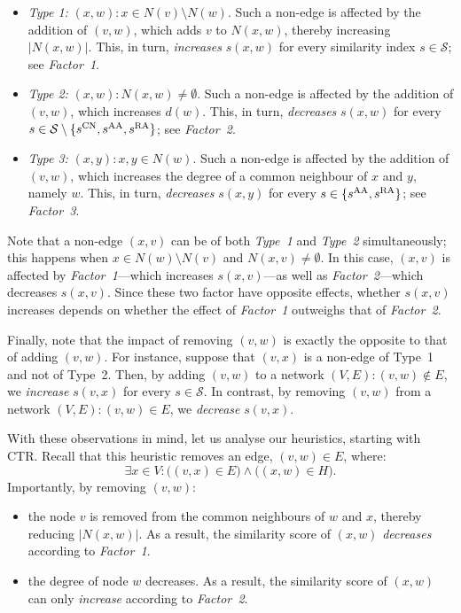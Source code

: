 \documentclass[twocolumn]{article}
\newcommand{\Hide}{H}
\newcommand{\sCN}{s^{\text{\normalfont CN}}}
\newcommand{\sAA}{s^{\text{\normalfont AA}}}
\newcommand{\sRA}{s^{\text{\normalfont RA}}}
\begin{document}
\begin{itemize}
\item \textit{Type 1:} $(x,w):x\in N(v)\setminus N(w)$.
Such a non-edge is affected by the addition of $(v,w)$, which adds $v$ to $N(x,w)$, thereby increasing $|N(x,w)|$. This, in turn, \emph{increases} $s(x,w)$ for every similarity index $s\in\mathcal{S}$; see \textit{Factor~1}.

\item \textit{Type 2:} $(x,w):N(x,w)\neq \emptyset$.
Such a non-edge is affected by the addition of $(v,w)$, which increases $d(w)$. This, in turn, \emph{decreases} $s(x,w)$ for every $s\in\mathcal{S}\setminus\{\sCN, \sAA, \sRA\}$; see \textit{Factor~2}.

\item \textit{Type 3:} $(x,y):x,y\in N(w)$.
Such a non-edge is affected by the addition of $(v,w)$, which increases the degree of a common neighbour of $x$ and $y$, namely $w$. This, in turn, \emph{decreases} $s(x,y)$ for every $s\in\{\sAA,\sRA\}$; see \textit{Factor~3}.
\end{itemize}

Note that a non-edge $(x,v)$ can be of both \textit{Type~1} and \textit{Type~2} simultaneously; this happens when $x\in N(w)\setminus N(v)$ and $N(x,v)\neq \emptyset$. In this case, $(x,v)$ is affected by \textit{Factor~1}---which increases $s(x,v)$---as well as \textit{Factor~2}---which decreases $s(x,v)$. Since these two factor have opposite effects, whether $s(x,v)$ increases depends on whether the effect of \textit{Factor~1} outweighs that of \textit{Factor~2}.

Finally, note that the impact of removing $(v,w)$ is exactly the opposite to that of adding $(v,w)$. For instance, suppose that $(v,x)$ is a non-edge of Type~1 and not of Type~2. Then, by adding $(v,w)$ to a network $(V,E):(v,w)\not\in E$, we \textit{increase} $s(v,x)$ for every $s\in\mathcal{S}$. In contrast, by removing $(v,w)$ from a network $(V,E):(v,w)\in E$, we \textit{decrease} $s(v,x)$.

With these observations in mind, let us analyse our heuristics, starting with CTR. Recall that this heuristic removes an edge, $(v,w)\in E$, where:
$$
\exists x\in V: \big((v,x)\in E\big) \wedge \big((x,w)\in\Hide\big).
$$
Importantly, by removing $(v,w)$:

\begin{itemize}
\item the node $v$ is removed from the common neighbours of $w$ and $x$, thereby reducing $|N(x,w)|$. As a result, the similarity score of $(x,w)$ \textit{decreases} according to \emph{Factor~1}.

\item the degree of node $w$ decreases. As a result, the similarity score of $(x,w)$ can only \textit{increase} according to \emph{Factor~2}.
\end{itemize}
\end{document}
